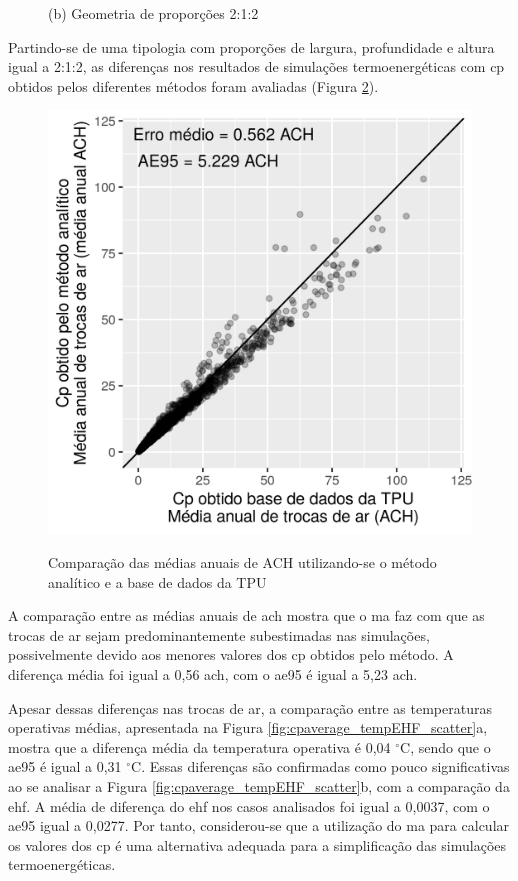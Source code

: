 \documentclass[brazil,hardcopy,openany]{ufscthesis} %
\begin{document}
\begin{figure}[h]
\begin{minipage}{.5\textwidth}
	\begin{center}
		\small{(b) Geometria de proporções 2:1:2}\\
		\phantom{}		
	\end{center}
	\end{minipage}
	\label{fig:cp_diff_scatter}
\end{figure}

Partindo-se de uma tipologia com proporções de largura, profundidade e altura igual a 2:1:2, as diferenças nos resultados de simulações termoenergéticas com \acrshort{cp} obtidos pelos diferentes métodos foram avaliadas (Figura \ref{fig:cpaverage_ACH_scatter}). %

\begin{figure}[H]
	\centering
	\caption{Comparação das médias anuais de ACH utilizando-se o método analítico e a base de dados da TPU}
	\includegraphics[width=.5\linewidth]{img/cpaverage_ACH_scatter.png}
	\label{fig:cpaverage_ACH_scatter}
\end{figure}

A comparação entre as médias anuais de \acrfull{ach} mostra que o \acrlong{ma} faz com que as trocas de ar sejam predominantemente subestimadas nas simulações, possivelmente devido aos menores valores dos \acrshort{cp} obtidos pelo método.
A diferença média foi igual a 0,56 \acrshort{ach}, com o \acrfull{ae95} é igual a 5,23 \acrshort{ach}.

Apesar dessas diferenças nas trocas de ar, a comparação entre as temperaturas operativas médias, apresentada na Figura \ref{fig:cpaverage_tempEHF_scatter}a, mostra que a diferença média da temperatura operativa é 0,04 $^{\circ}$C, sendo que o \acrshort{ae95} é igual a 0,31 $^{\circ}$C.
Essas diferenças são confirmadas como pouco significativas ao se analisar a Figura \ref{fig:cpaverage_tempEHF_scatter}b, com a comparação da \acrfull{ehf}. A média de diferença do \acrshort{ehf} nos casos analisados foi igual a 0,0037, com o \acrshort{ae95} igual a 0,0277.
Por tanto, considerou-se que a utilização do \acrlong{ma} para calcular os valores dos \acrshort{cp} é uma alternativa adequada para a simplificação das simulações termoenergéticas.
\end{document}
